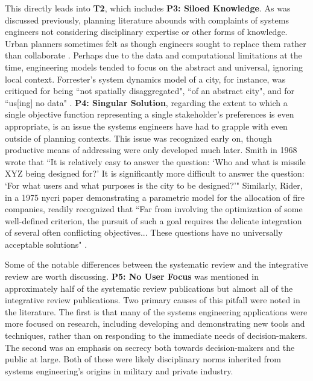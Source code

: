 This directly leads into \textbf{T2}, which includes \textbf{P3: Siloed Knowledge}. As was discussed previously, planning literature abounds with complaints of systems engineers not considering disciplinary expertise or other forms of knowledge. Urban planners sometimes felt as though engineers sought to replace them rather than collaborate \cite{lightWarfareWelfareDefense2005}. Perhaps due to the data and computational limitations at the time, engineering models tended to focus on the abstract and universal, ignoring local context. Forrester's system dynamics model of a city, for instance, was critiqued for being ``not spatially disaggregated", ``of an abstract city", and for ``us[ing] no data" \cite{leejrRequiemLargeScaleModels1973}. \textbf{P4: Singular Solution}, regarding the extent to which a single objective function representing a single stakeholder's preferences is even appropriate, is an issue the systems engineers have had to grapple with even outside of planning contexts. This issue was recognized early on, though productive means of addressing were only developed much later. Smith in 1968 wrote that ``It is relatively easy to answer the question: `Who and what is missile XYZ being designed for?' It is significantly more difficult to answer the question: `For what users and what purposes is the city to be designed?'" \cite{smithSystemsApproachUrban1968} Similarly, Rider, in a 1975 \ac{nycri} paper demonstrating a parametric model for the allocation of fire companies, readily recognized that ``Far from involving the optimization of some well-defined criterion, the pursuit of such a goal requires the delicate integration of several often conflicting objectives... These questions have no universally acceptable solutions" \cite{riderParametricModelAllocation1975}.

Some of the notable differences between the systematic review and the integrative review are worth discussing. \textbf{P5: No User Focus} was mentioned in approximately half of the systematic review publications but almost all of the integrative review publications. Two primary causes of this pitfall were noted in the literature. The first is that many of the systems engineering applications were more focused on research, including developing and demonstrating new tools and techniques, rather than on responding to the immediate needs of decision-makers. The second was an emphasis on secrecy both towards decision-makers and the public at large. Both of these were likely disciplinary norms inherited from systems engineering's origins in military and private industry.

